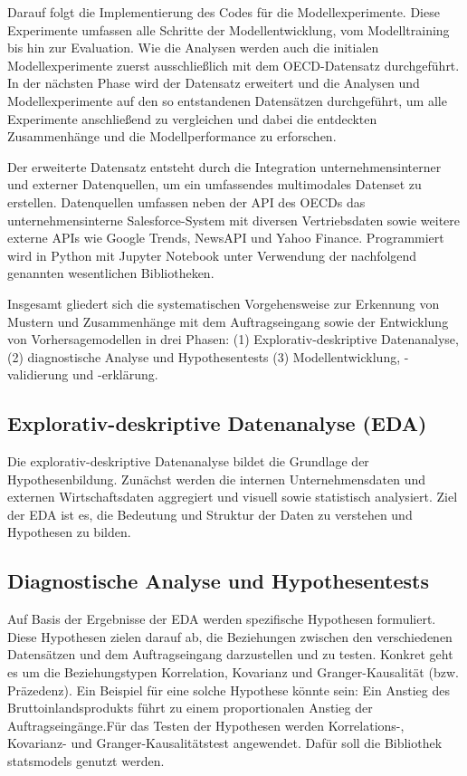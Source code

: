 \documentclass[lettersize,journal]{IEEEtran}
\begin{document}
Darauf folgt die Implementierung des Codes für die Modellexperimente. Diese Experimente umfassen alle Schritte der Modellentwicklung, vom Modelltraining bis hin zur Evaluation. Wie die Analysen werden auch die initialen Modellexperimente zuerst ausschließlich mit dem OECD-Datensatz durchgeführt. In der nächsten Phase wird der Datensatz erweitert und die Analysen und Modellexperimente auf den so entstandenen Datensätzen durchgeführt, um alle Experimente anschließend zu vergleichen und dabei die entdeckten Zusammenhänge und die Modellperformance zu erforschen.

Der erweiterte Datensatz entsteht durch die Integration unternehmensinterner und externer Datenquellen, um ein umfassendes multimodales Datenset zu erstellen. Datenquellen umfassen neben der API des OECDs das unternehmensinterne Salesforce-System mit diversen Vertriebsdaten sowie weitere externe APIs wie Google Trends, NewsAPI und Yahoo Finance. Programmiert wird in Python mit Jupyter Notebook unter Verwendung der nachfolgend genannten wesentlichen Bibliotheken.

Insgesamt gliedert sich die systematischen Vorgehensweise zur Erkennung von Mustern und Zusammenhänge mit dem Auftragseingang sowie der Entwicklung von Vorhersagemodellen in drei Phasen: (1) Explorativ-deskriptive Datenanalyse, (2) diagnostische Analyse und Hypothesentests (3) Modellentwicklung, -validierung und -erklärung.
\subsection{Explorativ-deskriptive Datenanalyse (EDA)}
Die explorativ-deskriptive Datenanalyse bildet die Grundlage der Hypothesenbildung. Zunächst werden die internen Unternehmensdaten und externen Wirtschaftsdaten aggregiert und visuell sowie statistisch analysiert. Ziel der EDA ist es, die Bedeutung und Struktur der Daten zu verstehen und Hypothesen zu bilden.
\subsection{Diagnostische Analyse und Hypothesentests}
Auf Basis der Ergebnisse der EDA werden spezifische Hypothesen formuliert. Diese Hypothesen zielen darauf ab, die Beziehungen zwischen den verschiedenen Datensätzen und dem Auftragseingang darzustellen und zu testen. Konkret geht es um die Beziehungstypen Korrelation, Kovarianz und Granger-Kausalität (bzw. Präzedenz). Ein Beispiel für eine solche Hypothese könnte sein: \glqq Ein Anstieg des Bruttoinlandsprodukts führt zu einem proportionalen Anstieg der Auftragseingänge.\grqq \space Für das Testen der Hypothesen werden Korrelations-, Kovarianz- und Granger-Kausalitätstest angewendet. Dafür soll die Bibliothek statsmodels genutzt werden.
\end{document}
